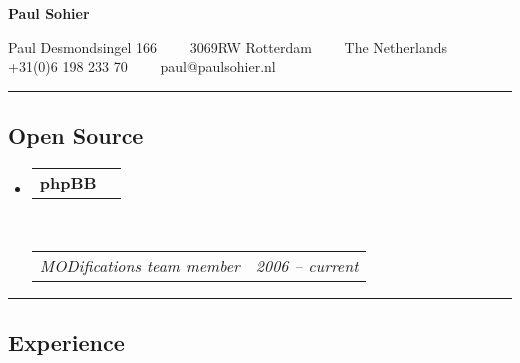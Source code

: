 \documentclass[10pt,letterpaper]{article}
\makeatletter
\newcommand{\headerrow}[2]
{\begin{tabular*}{\linewidth}{l@{\extracolsep{\fill}}r}
	#1 &
	#2 \\
\end{tabular*}}
\makeatother
\begin{document}
\begin{center}
{\LARGE \textbf{Paul Sohier}}

Paul Desmondsingel 166\ \ \textbullet
\ \ 3069RW Rotterdam\ \ \textbullet
\ \ The Netherlands
\\
+31(0)6 198 233 70\ \ \textbullet
\ \ paul@paulsohier.nl
\end{center}

\hrule
\vspace{-0.4em}
\subsection*{Open Source}

\begin{itemize}
	\parskip=0.1em

	\item
	\headerrow
		{\textbf{phpBB}}
		{\textbf{}}
	\\
	\headerrow
		{\emph{MODifications team member}}
		{\emph{2006 -- current}}
\end{itemize}

\hrule
\vspace{-0.4em}
\subsection*{Experience}
\end{document}
